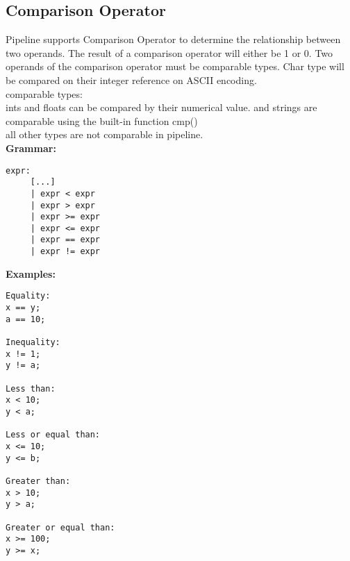 \documentclass[./Report_main.tex]{subfiles}
\begin{document}
\subsection{Comparison Operator}
Pipeline supports Comparison Operator to determine the relationship between two operands. The result of a comparison operator will either be 1 or 0. Two operands of the comparison operator must be comparable types. Char type will be compared on their integer reference on ASCII encoding.\\
comparable types:\\
ints and floats can be compared by their numerical value. and strings are comparable using the built-in function cmp()\\
all other types are not comparable in pipeline.\\
\vspace{1 mm}
\textbf{Grammar:}
\begin{lstlisting}
expr:
     [...]
     | expr < expr
     | expr > expr
     | expr >= expr
     | expr <= expr
     | expr == expr
     | expr != expr

\end{lstlisting}
\vspace{1 mm}
\textbf{Examples:}
\begin{lstlisting}
Equality:
x == y;
a == 10;

Inequality:
x != 1;
y != a;

Less than:
x < 10;
y < a;

Less or equal than:
x <= 10;
y <= b;

Greater than:
x > 10;
y > a;

Greater or equal than:
x >= 100;
y >= x;

\end{lstlisting}
\end{document}
